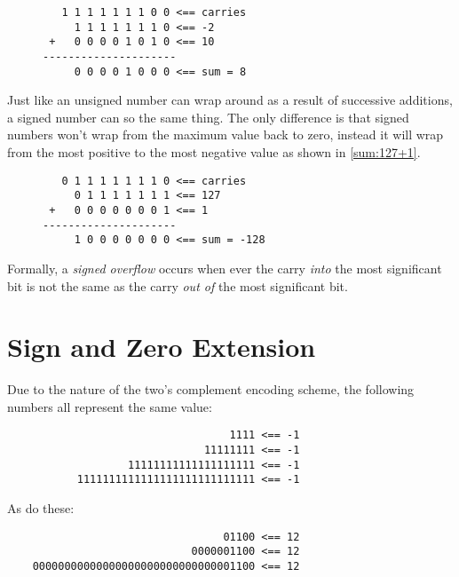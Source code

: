 \begin{figure}[H]
\centering
\begin{BVerbatim}
   1 1 1 1 1 1 1 0 0 <== carries
     1 1 1 1 1 1 1 0 <== -2
 +   0 0 0 0 1 0 1 0 <== 10
---------------------
     0 0 0 0 1 0 0 0 <== sum = 8
\end{BVerbatim}
\label{sum:-2+10}
\end{figure}

Just like an unsigned number can wrap around as a result of
successive additions, a signed number can so the same thing.  The
only difference is that signed numbers won't wrap from the maximum 
value back to zero, instead it will wrap from the most positive to 
the most negative value as shown in \autoref{sum:127+1}.
 
\begin{figure}[H]
\centering
\begin{BVerbatim}
   0 1 1 1 1 1 1 1 0 <== carries
     0 1 1 1 1 1 1 1 <== 127
 +   0 0 0 0 0 0 0 1 <== 1
---------------------
     1 0 0 0 0 0 0 0 <== sum = -128
\end{BVerbatim}
\label{sum:127+1}
\end{figure}

\begin{tcolorbox}
Formally, a {\em signed overflow} occurs when ever the carry
{\em into} the most significant bit is not the same as the 
carry {\em out of} the most significant bit.  
\end{tcolorbox}

\section{Sign and Zero Extension}

\label{SignExtension}
Due to the nature of the two's complement encoding scheme, the following 
numbers all represent the same value:
\begin{verbatim}
                                   1111 <== -1
                               11111111 <== -1
                   11111111111111111111 <== -1
           1111111111111111111111111111 <== -1
\end{verbatim}
As do these:
\begin{verbatim}
                                  01100 <== 12
                             0000001100 <== 12
    00000000000000000000000000000001100 <== 12
\end{verbatim}

